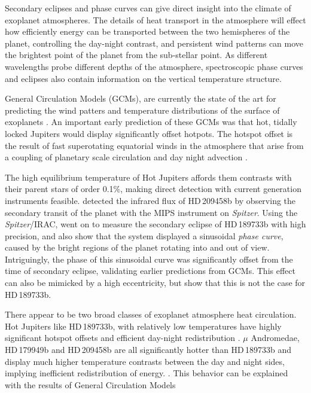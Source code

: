 \documentclass[a4paper,fleqn,usenatbib]{mnras}
\begin{document}
Secondary eclipses and phase curves can give direct insight into the climate of exoplanet atmospheres. The details of heat transport in the atmosphere will effect how efficiently energy can be transported between the two hemispheres of the planet, controlling the day-night contrast, and persistent wind patterns can move the brightest point of the planet from the sub-stellar point. As different wavelengths probe different depths of the atmosphere, spectroscopic phase curves and eclipses also contain information on the vertical temperature structure.

General Circulation Models (GCMs), are currently the state of the art for predicting the wind patters and temperature distributions of the surface of exoplanets \citep[e.g.][]{Showman2008}. An important early prediction of these GCMs was that hot, tidally locked Jupiters would display significantly offset hotpots. The hotspot offset is the result of fast superotating equatorial winds in the atmosphere that arise from a coupling of planetary scale circulation and day night advection \citep{Showman2011}.

The high equilibrium temperature of Hot Jupiters affords them contrasts with their parent stars of order 0.1\%, making direct detection with current generation instruments feasible. \citet{Deming2005} detected the infrared flux of HD\,209458b by observing the secondary transit of the planet with the MIPS instrument on \emph{Spitzer}. Using the \emph{Spitzer}/IRAC, \citet{Knutson2007b} went on to measure the secondary eclipse of HD\,189733b with high precision, and also show that the system displayed a sinusoidal \emph{phase curve}, caused by the bright regions of the planet rotating into and out of view. Intriguingly, the phase of this sinusoidal curve was significantly offset from the time of secondary eclipse, validating earlier predictions from GCMs. This effect can also be mimicked by a high eccentricity, but \citet{J.deWit2012a} show that this is not the case for HD\,189733b.

There appear to be two broad classes of exoplanet atmosphere heat circulation. Hot Jupiters like HD\,189733b, with relatively low temperatures have highly significant hotspot offsets and efficient day-night redistribution \citep{Knutson2007b}. $\mu$ Andromedae, HD\,179949b and HD\,209458b are all significantly hotter than HD\,189733b and display much higher temperature contrasts between the day and night sides, implying inefficient redistribution of energy. \citep{Harrington2006,Cowan2007,zellem2014}. This behavior can be explained with the results of General Circulation Models \citep{Komacek2015,Komacek2016}
\end{document}
